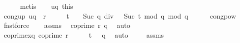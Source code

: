 \begin{isabellebody}
\ \ \ \ \isamarkupfalse%
\ metis\isanewline
\isanewline
\ \ \isamarkupfalse%
\ u{\isacharunderscore}{\kern0pt}q{\isacharunderscore}{\kern0pt}{}\ this\ \isamarkupfalse%
\ cong{\isacharunderscore}{\kern0pt}up{\isacharcolon}{\kern0pt}\ {\isachardoublequoteopen}{\isacharbrackleft}{\kern0pt}{\isacharquery}{\kern0pt}uq\ {\isacharequal}{\kern0pt}\ {\isacharparenleft}{\kern0pt}{\isacharparenleft}{\kern0pt}r\ {\isacharcircum}{\kern0pt}\ {}{\isacharparenright}{\kern0pt}\ {\isacharcircum}{\kern0pt}\ {\isacharparenleft}{\kern0pt}{}\ {\isacharcircum}{\kern0pt}\ {\isacharparenleft}{\kern0pt}t\ {\isacharplus}{\kern0pt}\ {}{\isacharparenright}{\kern0pt}{\isacharparenright}{\kern0pt}{\isacharparenright}{\kern0pt}\ {\isacharcircum}{\kern0pt}\ {\isacharparenleft}{\kern0pt}{\isacharparenleft}{\kern0pt}{\isacharparenleft}{\kern0pt}Suc\ q{\isacharparenright}{\kern0pt}\ div\ {}{\isacharparenright}{\kern0pt}\ {\isacharcircum}{\kern0pt}\ {\isacharparenleft}{\kern0pt}Suc\ t{\isacharparenright}{\kern0pt}\ mod\ {\isacharparenleft}{\kern0pt}q{\isacharminus}{\kern0pt}{}{\isacharparenright}{\kern0pt}{\isacharparenright}{\kern0pt}{\isacharbrackright}{\kern0pt}\ {\isacharparenleft}{\kern0pt}mod\ q{\isacharparenright}{\kern0pt}{\isachardoublequoteclose}\isanewline
\ \ \ \ \isamarkupfalse%
\ cong{\isacharunderscore}{\kern0pt}pow\ \isamarkupfalse%
\ fastforce\isanewline
\isanewline
\ \ \isamarkupfalse%
\ assms{\isacharparenleft}{\kern0pt}{}{\isacharparenright}{\kern0pt}\ \isamarkupfalse%
\ {\isachardoublequoteopen}coprime\ r\ q{\isachardoublequoteclose}\ \isamarkupfalse%
\ auto\isanewline
\ \ \isamarkupfalse%
\ \isamarkupfalse%
\ coprime{\isacharunderscore}{\kern0pt}xq{\isacharcolon}{\kern0pt}\ {\isachardoublequoteopen}coprime\ {\isacharparenleft}{\kern0pt}{\isacharparenleft}{\kern0pt}r\ {\isacharcircum}{\kern0pt}\ {}{\isacharparenright}{\kern0pt}\ {\isacharcircum}{\kern0pt}\ {\isacharparenleft}{\kern0pt}{}\ {\isacharcircum}{\kern0pt}\ {\isacharparenleft}{\kern0pt}t\ {\isacharplus}{\kern0pt}\ {}{\isacharparenright}{\kern0pt}{\isacharparenright}{\kern0pt}{\isacharparenright}{\kern0pt}\ q{\isachardoublequoteclose}\ \isamarkupfalse%
\ auto\ \isanewline
\ \ \isamarkupfalse%
\ assms{\isacharparenleft}{\kern0pt}{}{\isacharparenright}{\kern0pt}\ \isamarkupfalse%

\end{isabellebody}

